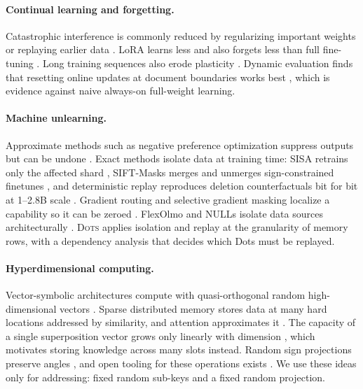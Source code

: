 \documentclass[journal]{IEEEtran}
\newcommand{\sys}{\textsc{Dots}}
\let\citep\cite \let\citet\cite
\begin{document}
\paragraph{Continual learning and forgetting.} Catastrophic interference \citep{mccloskey1989} is commonly reduced by regularizing important weights \citep{kirkpatrick2017ewc} or replaying earlier data \citep{ibrahim2024simple}. LoRA \citep{hu2022lora} learns less and also forgets less than full fine-tuning \citep{biderman2024lora}. Long training sequences also erode plasticity \citep{dohare2024loss}. Dynamic evaluation finds that resetting online updates at document boundaries works best \citep{rannentriki2024dynamic}, which is evidence against naive always-on full-weight learning.

\paragraph{Machine unlearning.} Approximate methods such as negative preference optimization \citep{zhang2024npo} suppress outputs but can be undone \citep{zhang2025quant}. Exact methods isolate data at training time: SISA retrains only the affected shard \citep{bourtoule2021sisa}, SIFT-Masks merges and unmerges sign-constrained finetunes \citep{kuo2025sift}, and deterministic replay reproduces deletion counterfactuals bit for bit at 1--2.8B scale \citep{x2025trace}. Gradient routing and selective gradient masking localize a capability so it can be zeroed \citep{cloud2024gradient,shilov2025sgtm}. FlexOlmo and NULLs isolate data sources architecturally \citep{shi2025flexolmo,ghosal2026nulls}. \sys{} applies isolation and replay at the granularity of memory rows, with a dependency analysis that decides which Dots must be replayed.

\paragraph{Hyperdimensional computing.} Vector-symbolic architectures compute with quasi-orthogonal random high-dimensional vectors \citep{plate1995hrr,kanerva2009hdc}. Sparse distributed memory \citep{kanerva1988sdm} stores data at many hard locations addressed by similarity, and attention approximates it \citep{bricken2021attention}. The capacity of a single superposition vector grows only linearly with dimension \citep{frady2018theory}, which motivates storing knowledge across many slots instead. Random sign projections preserve angles \citep{charikar2002simhash}, and open tooling for these operations exists \citep{heddes2023torchhd}. We use these ideas only for addressing: fixed random sub-keys and a fixed random projection.
\end{document}
